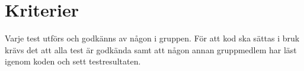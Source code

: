 \section{Kriterier}
Varje test utförs och godkänns av någon i gruppen. För att kod ska sättas i bruk krävs det att alla test är godkända samt att någon annan gruppmedlem har läst igenom koden och sett testresultaten.